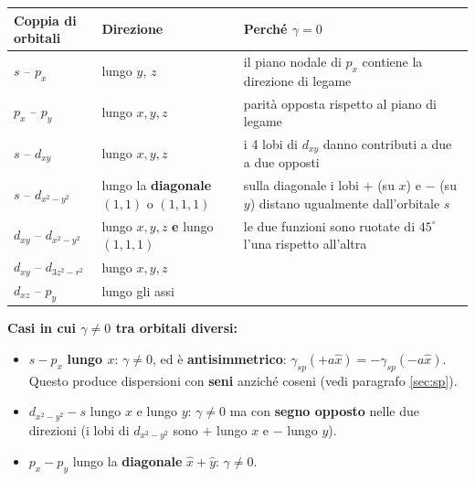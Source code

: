 \begin{center}
\renewcommand{\arraystretch}{1.45}
{\small
\begin{tabular}{p{5.6cm} p{3.2cm} p{7.6cm}}
\toprule
\textbf{Coppia di orbitali} & \textbf{Direzione} & \textbf{Perché $\gamma=0$} \\
\midrule
$s$ -- $p_x$ & lungo $y$, $z$ & il piano nodale di $p_x$ contiene la direzione di legame \\
$p_x$ -- $p_y$ & lungo $x,y,z$ & parità opposta rispetto al piano di legame \\
$s$ -- $d_{xy}$ & lungo $x,y,z$ & i 4 lobi di $d_{xy}$ danno contributi a due a due opposti \\
$s$ -- $d_{x^2-y^2}$ & lungo la \textbf{diagonale} $(1,1)$ o $(1,1,1)$ & sulla diagonale i lobi $+$ (su $x$) e $-$ (su $y$) distano ugualmente dall'orbitale $s$ \\
$d_{xy}$ -- $d_{x^2-y^2}$ & lungo $x,y,z$ \textbf{e} lungo $(1,1,1)$ & le due funzioni sono ruotate di $45^\circ$ l'una rispetto all'altra \\
$d_{xy}$ -- $d_{3z^2-r^2}$ & lungo $x,y,z$ & \\
$d_{xz}$ -- $p_y$ & lungo gli assi & \\
\bottomrule
\end{tabular}}
\end{center}


\vspace{0.3cm}

\textbf{Casi in cui $\gamma\neq0$ tra orbitali diversi:}
\begin{itemize}
  \item $s - p_x$ \textbf{lungo $x$}: $\gamma\neq0$, ed è \textbf{antisimmetrico}: $\gamma_{sp}(+a\hat x) = -\gamma_{sp}(-a\hat x)$. Questo produce dispersioni con \textbf{seni} anziché coseni (vedi paragrafo \ref{sec:sp}).
  \item $d_{x^2-y^2} - s$ lungo $x$ e lungo $y$: $\gamma\neq0$ ma con \textbf{segno opposto} nelle due direzioni (i lobi di $d_{x^2-y^2}$ sono $+$ lungo $x$ e $-$ lungo $y$).
  \item $p_x - p_y$ lungo la \textbf{diagonale} $\hat x+\hat y$: $\gamma\neq0$.
\end{itemize}

